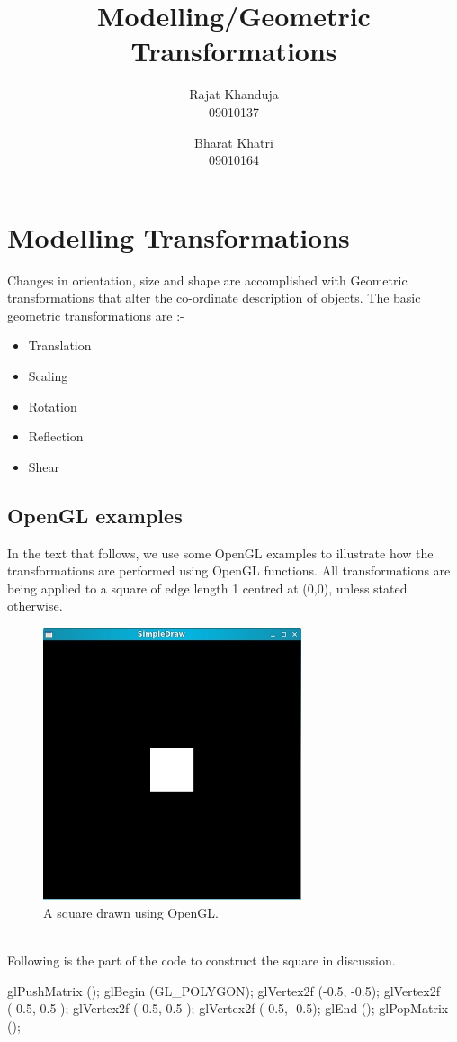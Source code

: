 \documentclass[a4paper,12pt,titlepage,twosided]{article}
\begin{document}
\title{Modelling/Geometric Transformations}

\author{Rajat Khanduja \\
	09010137 \\
	\and
	Bharat Khatri\\
	09010164}
\date{} %

\maketitle

\tableofcontents
\pagebreak

\section{Modelling Transformations}
	Changes in orientation, size and shape are accomplished with Geometric transformations that alter the co-ordinate description of objects. The basic geometric transformations are :- \\
	\begin{itemize}
		\item Translation
		\item Scaling
		\item Rotation
		\item Reflection
		\item Shear
	\end{itemize}

	\subsection{OpenGL examples}
	In the text that follows, we use some OpenGL examples to illustrate how the transformations are performed using OpenGL functions. All transformations are being applied to a square of edge length 1 centred at (0,0), unless stated otherwise. 	
	\begin{figure}
		\centering
		\includegraphics[height=80mm]{Images_final/Square.jpg}
		\caption{A square drawn using OpenGL.}
	\end{figure}
	\\
	Following is the part of the code to construct the square in discussion. 
	\begin{code}
		glPushMatrix ();
		glBegin (GL_POLYGON);
		glVertex2f (-0.5, -0.5);
		glVertex2f (-0.5, 0.5 );
		glVertex2f ( 0.5, 0.5 );
		glVertex2f ( 0.5, -0.5);
		glEnd ();
		glPopMatrix ();
	\end{code}
	
\end{document}

